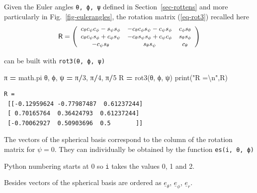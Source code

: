\documentclass[
  a4paper,
  numbers=noendperiod,
  DIV=12]{scrreprt}
\newenvironment{Shaded}{\begin{snugshade}}{\end{snugshade}}
\newcommand{\BuiltInTok}[1]{#1}
\newcommand{\CharTok}[1]{\textcolor[rgb]{0.31,0.60,0.02}{#1}}
\newcommand{\DecValTok}[1]{\textcolor[rgb]{0.00,0.00,0.81}{#1}}
\newcommand{\NormalTok}[1]{#1}
\newcommand{\OperatorTok}[1]{\textcolor[rgb]{0.81,0.36,0.00}{\textbf{#1}}}
\newcommand{\StringTok}[1]{\textcolor[rgb]{0.31,0.60,0.02}{#1}}
\newcommand{\uv}[1]{{\underline{{#1}}}}
\newcommand{\ve}[1]{{\uv{{e}}_{{#1}}}}
\newcommand{\mat}{\mathsf}
\begin{document}
Given the Euler angles \texttt{θ,\ ϕ,\ ψ} defined in
Section~\ref{sec-rottens} and more particularly in
Fig.~\ref{fig-eulerangles}, the rotation matrix (\ref{eq-rot3}) recalled
here \[
\small
\mat{R}=
   \left(
   \begin{array}{ccc}
   c_\theta  c_\psi  c_\phi - s_\psi  s_\phi & - c_\theta  c_\phi  s_\psi - c_\psi  s_\phi & c_\phi  s_\theta \\
   c_\theta  c_\psi  s_\phi + c_\phi  s_\psi & - c_\theta  s_\psi  s_\phi + c_\psi  c_\phi & s_\theta  s_\phi \\
   - c_\psi  s_\theta & s_\theta  s_\psi & c_\theta \\
   \end{array}
   \right) 
\]

can be built with \texttt{rot3(θ,\ ϕ,\ ψ)}

\begin{Shaded}
\begin{Highlighting}[]
\NormalTok{π }\OperatorTok{=}\NormalTok{ math.pi}
\NormalTok{θ, ϕ, ψ }\OperatorTok{=}\NormalTok{ π}\OperatorTok{/}\DecValTok{3}\NormalTok{, π}\OperatorTok{/}\DecValTok{4}\NormalTok{, π}\OperatorTok{/}\DecValTok{5}
\NormalTok{R }\OperatorTok{=}\NormalTok{ rot3(θ, ϕ, ψ)}
\BuiltInTok{print}\NormalTok{(}\StringTok{"R =}\CharTok{\textbackslash{}n}\StringTok{"}\NormalTok{,R)}
\end{Highlighting}
\end{Shaded}

\begin{verbatim}
R =
 [[-0.12959624 -0.77987487  0.61237244]
 [ 0.70165764  0.36424793  0.61237244]
 [-0.70062927  0.50903696  0.5       ]]
\end{verbatim}

The vectors of the spherical basis correspond to the column of the
rotation matrix for \(\psi=0\). They can individually be obtained by the
function \texttt{es(i,\ θ,\ ϕ)}

\begin{tcolorbox}[enhanced jigsaw, title=\textcolor{quarto-callout-warning-color}{\faExclamationTriangle}\hspace{0.5em}{Warning}, left=2mm, titlerule=0mm, colback=white, breakable, colframe=quarto-callout-warning-color-frame, bottomtitle=1mm, toptitle=1mm, rightrule=.15mm, bottomrule=.15mm, coltitle=black, opacitybacktitle=0.6, arc=.35mm, colbacktitle=quarto-callout-warning-color!10!white, leftrule=.75mm, opacityback=0, toprule=.15mm]

Python numbering starts at 0 so \texttt{i} takes the values 0, 1 and 2.

Besides vectors of the spherical basis are ordered as \(\ve{\theta}\),
\(\ve{\phi}\), \(\ve{r}\).

\end{tcolorbox}
\end{document}
